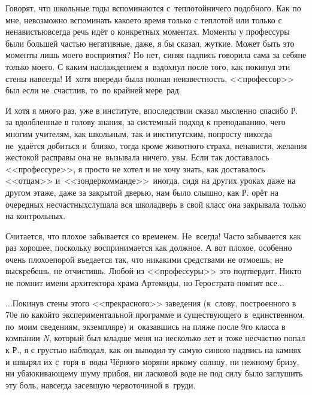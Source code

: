 Говорят, что школьные годы вспоминаются с~теплотой\mdash ничего подобного. Как по мне, невозможно вспоминать какое\sdash то время только с теплотой или только с ненавистью\mdash всегда речь идёт о конкретных моментах. Моменты у профессуры были большей частью негативные, даже, я бы сказал, жуткие. Может быть это моменты лишь моего восприятия? Но нет, синяя надпись говорила сама за себя\mdash не только моего. С каким наслаждением я~вздохнул после того, как покинул эти стены навсегда! И~хотя впереди была полная неизвестность, <<профессор>> был если не~счастлив, то~по крайней мере~рад. 

И хотя я много раз, уже в институте, впоследствии сказал мысленно спасибо Р. за вдолбленные в голову знания, за системный подход к преподаванию, чего многим учителям, как школьным, так и институтским, попросту никогда не~удаётся добиться и~близко, тогда кроме животного страха, ненависти, желания жестокой расправы она не~вызывала ни\sdash че\sdash го, увы. Если так доставалось <<профессуре>>, я просто не хотел и не хочу знать, как доставалось <<отцам>> и~<<зондеркомманде>>~\cite{ГеографГлобусПропил}\mdash иногда, сидя на других уроках даже на другом этаже, даже за закрытой дверью, нам было слышно, как Р. орёт на очередных несчастных\mdash слушала вся школа\mdash дверь в свой класс она закрывала только на контрольных.

Считается, что плохое забывается со временем. Не~всегда! Часто забывается как раз хорошее, поскольку воспринимается как должное. А вот плохое, особенно очень плохое\mdash порой въедается так, что никакими средствами не отмоешь, не выскребешь, не отчистишь. Любой из <<профессуры>> это подтвердит. Никто не помнит имени архитектора храма Артемиды, но Герострата помнят все$\ldots$

$\ldots$Покинув стены этого <<прекрасного>> заведения (к~слову, построенного в 70\sdash е по какой\sdash то экспериментальной программе и существующего в~единственном, по~моим сведениям, экземпляре) и~оказавшись на пляже после 9\sdash го класса в компании \textit{N}, который был младше меня на несколько лет и тоже несчастно попал к Р., я с грустью наблюдал, как он выводил ту самую синюю надпись на камнях и швырял их с~горя в~воды Чёрного моря\mdash ни яркому солнцу, ни нежному бризу, ни убаюкивающему шуму прибоя, ни ласковой воде не под силу было заглушить эту боль, навсегда засевшую червоточиной в~груди.

\begin{center}
\end{center}